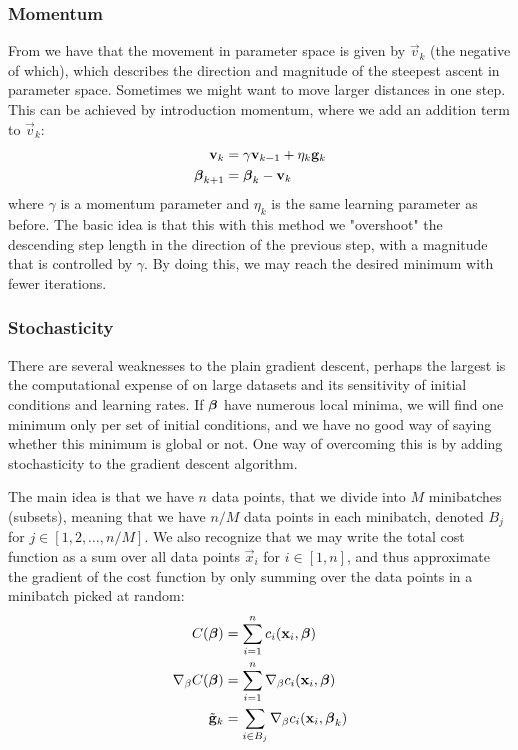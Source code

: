     \subsubsection{Momentum}\label{sec:momentum}
        From  we have that the movement in parameter space is given by $\vec{v}_k$ (the negative of which), which describes the direction and magnitude of the steepest ascent in parameter space. Sometimes we might want to move larger distances in one step. This can be achieved by introduction momentum, where we add an addition term to $\vec{v}_k$:
        \begin{align}
            \mathbf{v}_k &= \gamma\mathbf{v}_{k-1} + \eta_k\mathbf{g}_k \nonumber \\
            \boldsymbol{\beta}_{k+1} &= \boldsymbol{\beta}_k - \mathbf{v}_k
        \end{align}
        where $\gamma$ is a momentum parameter and $\eta_k$ is the same learning parameter as before. The basic idea is that this with this method we "overshoot" the descending step length in the direction of the previous step, with a magnitude that is controlled by $\gamma$. By doing this, we may reach the desired minimum with fewer iterations. 

    \subsubsection{Stochasticity}\label{sec:stochasticity}
        There are several weaknesses to the plain gradient descent, perhaps the largest is the computational expense of on large datasets and its sensitivity of initial conditions and learning rates. If $\boldsymbol{\beta}$ have numerous local minima, we will find one minimum only per set of initial conditions, and we have no good way of saying whether this minimum is global or not. One way of overcoming this is by adding stochasticity to the gradient descent algorithm. 

        The main idea is that we have $n$ data points, that we divide into $M$ minibatches (subsets), meaning that we have $n/M$ data points in each minibatch, denoted $B_j$ for $j\in[1,2,\dots,n/M]$. We also recognize that we may write the total cost function as a sum over all data points $\vec{x}_i$ for $i\in[1,n]$, and thus approximate the gradient of the cost function by only summing over the data points in a minibatch picked at random:
        \begin{align}
            C(\boldsymbol{\beta}) &= \sum_{i=1}^nc_i(\mathbf{x}_i, \boldsymbol{\beta}) \nonumber \\
            \nabla_\beta C(\boldsymbol{\beta}) &= \sum_{i=1}^n \nabla_{\beta}c_i(\mathbf{x}_i,\boldsymbol{\beta}) \nonumber \\
            \tilde{\mathbf{g}}_k &= \sum_{i\in B_j}\nabla_\beta c_i(\mathbf{x}_i, \boldsymbol{\beta}_k)
        \end{align}

